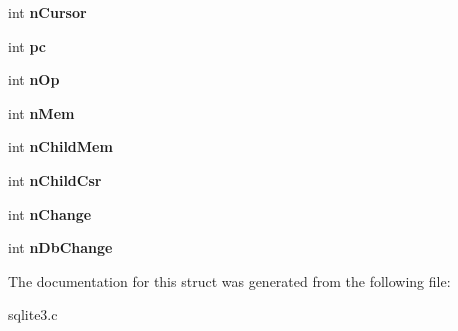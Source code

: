 \begin{DoxyCompactItemize}
\item 
int {\bfseries n\+Cursor}\hypertarget{structVdbeFrame_a9b74ca630c19ab905db3be4e78dbd9e1}{}\label{structVdbeFrame_a9b74ca630c19ab905db3be4e78dbd9e1}

\item 
int {\bfseries pc}\hypertarget{structVdbeFrame_aed0e6d8cb1908580a3c2aca04516b46c}{}\label{structVdbeFrame_aed0e6d8cb1908580a3c2aca04516b46c}

\item 
int {\bfseries n\+Op}\hypertarget{structVdbeFrame_acffd5d53fbb5cb55e257c34a547c1762}{}\label{structVdbeFrame_acffd5d53fbb5cb55e257c34a547c1762}

\item 
int {\bfseries n\+Mem}\hypertarget{structVdbeFrame_ab340f2b5f6d6e09a872f5f8a64fec245}{}\label{structVdbeFrame_ab340f2b5f6d6e09a872f5f8a64fec245}

\item 
int {\bfseries n\+Child\+Mem}\hypertarget{structVdbeFrame_a833bdf519676567bc3a700cdedc6562d}{}\label{structVdbeFrame_a833bdf519676567bc3a700cdedc6562d}

\item 
int {\bfseries n\+Child\+Csr}\hypertarget{structVdbeFrame_a2d2900348092258d12eb71057812429a}{}\label{structVdbeFrame_a2d2900348092258d12eb71057812429a}

\item 
int {\bfseries n\+Change}\hypertarget{structVdbeFrame_a77aacb67d627f4446dd50a795b5a2f0f}{}\label{structVdbeFrame_a77aacb67d627f4446dd50a795b5a2f0f}

\item 
int {\bfseries n\+Db\+Change}\hypertarget{structVdbeFrame_ab25b753f6356e7b9561717a58cfa4181}{}\label{structVdbeFrame_ab25b753f6356e7b9561717a58cfa4181}

\end{DoxyCompactItemize}


The documentation for this struct was generated from the following file\+:\begin{DoxyCompactItemize}
\item 
sqlite3.\+c\end{DoxyCompactItemize}

